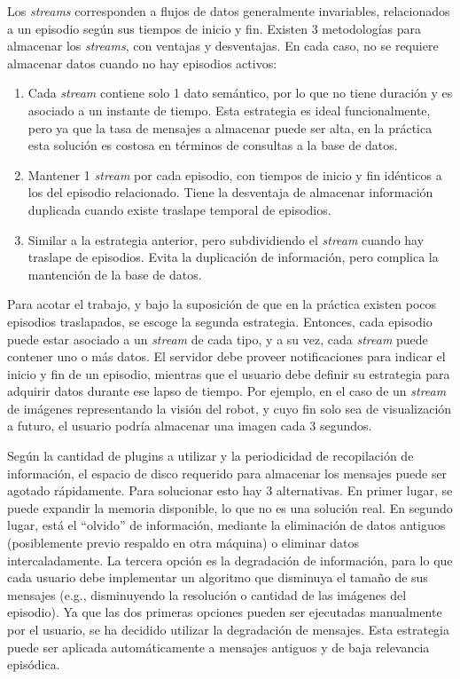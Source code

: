 Los \textit{streams} corresponden a flujos de datos generalmente invariables, relacionados a un episodio según sus tiempos de inicio y fin. Existen 3 metodologías para almacenar los \textit{streams}, con ventajas y desventajas. En cada caso, no se requiere almacenar datos cuando no hay episodios activos:
\begin{enumerate}
	\item Cada \textit{stream} contiene solo 1 dato semántico, por lo que no tiene duración y es asociado a un instante de tiempo. Esta estrategia es ideal funcionalmente, pero ya que la tasa de mensajes a almacenar puede ser alta, en la práctica esta solución es costosa en términos de consultas a la base de datos.
	\item Mantener 1 \textit{stream} por cada episodio, con tiempos de inicio y fin idénticos a los del episodio relacionado. Tiene la desventaja de almacenar información duplicada cuando existe traslape temporal de episodios.
	\item Similar a la estrategia anterior, pero subdividiendo el \textit{stream} cuando hay traslape de episodios. Evita la duplicación de información, pero complica la mantención de la base de datos.
\end{enumerate}

Para acotar el trabajo, y bajo la suposición de que en la práctica existen pocos episodios traslapados, se escoge la segunda estrategia. Entonces, cada episodio puede estar asociado a un \textit{stream} de cada tipo, y a su vez, cada \textit{stream} puede contener uno o más datos. El servidor debe proveer notificaciones para indicar el inicio y fin de un episodio, mientras que el usuario debe definir su estrategia para adquirir datos durante ese lapso de tiempo. Por ejemplo, en el caso de un \textit{stream} de imágenes representando la visión del robot, y cuyo fin solo sea de visualización a futuro, el usuario podría almacenar una imagen cada 3 segundos. 

Según la cantidad de plugins a utilizar y la periodicidad de recopilación de información, el espacio de disco requerido para almacenar los mensajes puede ser agotado rápidamente. Para solucionar esto hay 3 alternativas. En primer lugar, se puede expandir la memoria disponible, lo que no es una solución real. En segundo lugar, está el ``olvido'' de información, mediante la eliminación de datos antiguos (posiblemente previo respaldo en otra máquina) o eliminar datos intercaladamente. La tercera opción es la degradación de información, para lo que cada usuario debe implementar un algoritmo que disminuya el tamaño de sus mensajes (e.g., disminuyendo la resolución o cantidad de las imágenes del episodio). Ya que las dos primeras opciones pueden ser ejecutadas manualmente por el usuario, se ha decidido utilizar la degradación de mensajes. Esta estrategia puede ser aplicada automáticamente a mensajes antiguos y de baja relevancia episódica.

